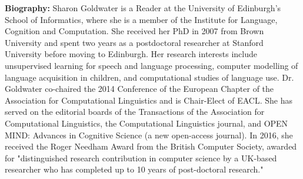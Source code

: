 \vspace{3em}\par 

\vfill
\noindent

{\bfseries Biography:} Sharon Goldwater is a Reader at the University of Edinburgh's
  School of Informatics, where she is a member of the Institute for
  Language, Cognition and Computation. She received her PhD in 2007
  from Brown University and spent two years as a postdoctoral
  researcher at Stanford University before moving to Edinburgh. Her
  research interests include unsupervised learning for speech and
  language processing, computer modelling of language acquisition
  in children, and computational studies of language
  use. Dr. Goldwater co-chaired the 2014 Conference of the European
  Chapter of the Association for Computational Linguistics and is
  Chair-Elect of EACL. She has served on the editorial boards of
  the Transactions of the Association for Computational
  Linguistics, the Computational Linguistics journal, and OPEN
  MIND: Advances in Cognitive Science (a new open-access
  journal). In 2016, she received the Roger Needham Award from the
  British Computer Society, awarded for "distinguished research
  contribution in computer science by a UK-based researcher who has
  completed up to 10 years of post-doctoral research."
\newpage
